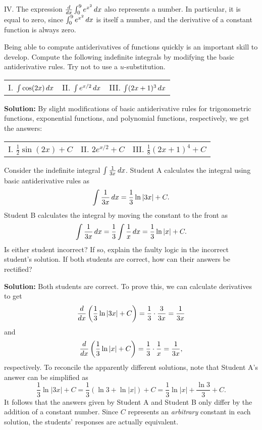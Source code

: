 \documentclass[handout,hints]{ximera}
\begin{document}
IV. The expression $\frac{d}{dx} \int_0^9 e^{x^2} \mathop{}\!d x$ also represents a number. In particular, it is equal to zero, since $\int_0^9 e^{x^2} \mathop{}\!d x$ is itself a number, and the derivative of a constant function is always zero.

\begin{problem}
Being able to compute antiderivatives of functions quickly is an important skill to develop.  Compute the following indefinite integrals by modifying the basic antiderivative rules.  Try not to use a $u$-substitution.

\begin{center}
\begin{tabular}{lll} 
I. $\int \cos(2x) \mathop{}\!d x$ \hspace{.7in} & II. $\int e^{x/2} \mathop{}\!d x$ \hspace{.7in} & III. $\int (2x+1)^3 \mathop{}\!d x$
\end{tabular}
\end{center}

\end{problem}

\textbf{Solution:} By slight modifications of basic antiderivative rules for trigonometric functions, exponential functions, and polynomial functions, respectively, we get the answers:

\begin{tabular}{lll} 
I. $\frac{1}{2} \sin(2x) + C$ \hspace{.7in} & II. $2 e^{x/2} + C$ \hspace{.7in} & III. $\frac{1}{8} (2x+1)^4 + C$
\end{tabular}

\begin{problem}
Consider the indefinite integral $\int \frac{1}{3x} \mathop{}\!d x$. Student A calculates the integral using basic antiderivative rules as
$$
\int \frac{1}{3x} \mathop{}\!d x = \frac{1}{3} \ln |3x| + C.
$$
Student B calculates the integral by moving the constant to the front as 
$$
\int \frac{1}{3x} \mathop{}\!d x = \frac{1}{3} \int \frac{1}{x} \mathop{}\!d x = \frac{1}{3} \ln |x| + C.
$$
Is either student incorrect?  If so, explain the faulty logic in the incorrect student's solution.  If both students are correct, how can their answers be rectified?

\end{problem}

\textbf{Solution:} Both students are correct. To prove this, we can calculate derivatives to get
$$
\frac{\mathop{}\!d}{\mathop{}\!d x} \left(\frac{1}{3} \ln |3x| + C\right) = \frac{1}{3} \cdot  \frac{3}{3x} = \frac{1}{3x}
$$
and 
$$
\frac{\mathop{}\!d}{\mathop{}\!d x} \left(\frac{1}{3} \ln |x| + C\right) = \frac{1}{3} \cdot \frac{1}{x} = \frac{1}{3x},
$$
respectively. To reconcile the apparently different solutions, note that Student A's answer can be simplified as
$$
\frac{1}{3} \ln |3x| + C = \frac{1}{3} \left(\ln 3 + \ln |x|\right) + C = \frac{1}{3} \ln |x| + \frac{\ln 3}{3} + C.
$$
It follows that the answers given by Student A and Student B only differ by the addition of a constant number. Since $C$ represents an \textit{arbitrary} constant in each solution, the students' responses are actually equivalent.
\end{document}
